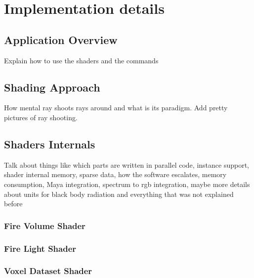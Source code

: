 \chapter{Implementation details}
\label{ch:implementation_details}


\section{Application Overview}
\label{sec:application_overview}

Explain how to use the shaders and the commands


\section{\MentalRay Shading Approach}
\label{sec:mental_ray_shading_approach}

How mental ray shoots rays around and what is its paradigm.
Add pretty pictures of ray shooting.


\section{Shaders Internals}
\label{sec:shaders_internals}

Talk about things like which parts are written in parallel code, instance support, shader internal memory, sparse data, how the software escalates, memory consumption, Maya integration, spectrum to rgb integration, maybe more details about units for black body radiation and everything that was not explained before

\subsection{Fire Volume Shader}
\label{sec:fire_volume_shader}


\subsection{Fire Light Shader}
\label{sec:fire_light_shader}


\subsection{Voxel Dataset Shader}
\label{sec:voxel_dataset_shader}